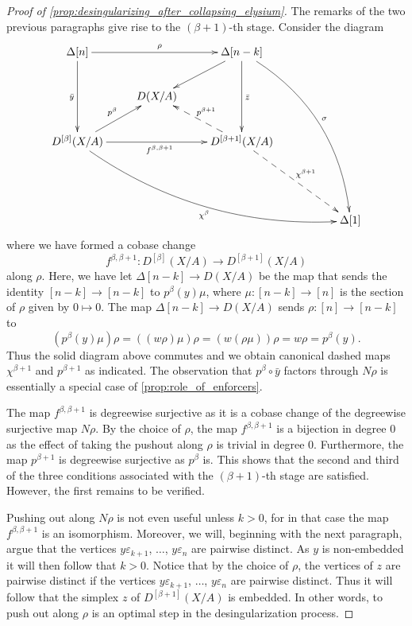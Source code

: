 \begin{proof}[Proof of \cref{prop:desingularizing_after_collapsing_elysium}]
The remarks of the two previous paragraphs give rise to the $(\beta +1)$-th stage. Consider the diagram
\begin{displaymath}
\xymatrix{
\Delta [n] \ar[dd]_{\bar{y} } \ar[rr]^\rho && \Delta [n-k] \ar[ld] \ar[dd]^{\bar{z} } \ar@/^2pc/[ddddrr]^\sigma \\
& D(X/A) \\
D^{[\beta ]}(X/A) \ar[ur]^{p^\beta } \ar@/_2pc/[ddrrrr]_{\chi ^\beta } \ar[rr]_{f^{\beta ,\beta +1}} && D^{[\beta +1]}(X/A) \ar@{-->}[lu]_{p^{\beta +1}} \ar@{-->}[ddrr]^{\chi ^{\beta +1}} \\
\\
&&&& \Delta [1]
}
\end{displaymath}
where we have formed a cobase change
\[f^{\beta ,\beta +1}:D^{[\beta ]}(X/A)\to D^{[\beta +1]}(X/A)\]
along $\rho$. Here, we have let $\Delta [n-k]\to D(X/A)$ be the map that sends the identity $[n-k]\to [n-k]$ to $p^\beta (y)\mu$, where $\mu :[n-k]\to [n]$ is the section of $\rho$ given by $0\mapsto 0$. The map $\Delta [n-k]\to D(X/A)$ sends $\rho :[n]\to [n-k]$ to
\[(p^\beta (y)\mu )\rho =((w\rho )\mu )\rho =(w(\rho \mu ))\rho =w\rho =p^\beta (y).\]
Thus the solid diagram above commutes and we obtain canonical dashed maps $\chi ^{\beta +1}$ and $p^{\beta +1}$ as indicated. The observation that $p^\beta \circ \bar{y}$ factors through $N\rho$ is essentially a special case of \cref{prop:role_of_enforcers}.

The map $f^{\beta ,\beta +1}$ is degreewise surjective as it is a cobase change of the degreewise surjective map $N\rho$. By the choice of $\rho$, the map $f^{\beta ,\beta +1}$ is a bijection in degree $0$ as the effect of taking the pushout along $\rho$ is trivial in degree $0$. Furthermore, the map $p^{\beta +1}$ is degreewise surjective as $p^\beta$ is. This shows that the second and third of the three conditions associated with the $(\beta +1)$-th stage are satisfied. However, the first remains to be verified.

Pushing out along $N\rho$ is not even useful unless $k>0$, for in that case the map $f^{\beta ,\beta +1}$ is an isomorphism. Moreover, we will, beginning with the next paragraph, argue that the vertices $y\varepsilon _{k+1}$, $\dots$, $y\varepsilon _n$ are pairwise distinct. As $y$ is non-embedded it will then follow that $k>0$. Notice that by the choice of $\rho$, the vertices of $z$ are pairwise distinct if the vertices $y\varepsilon _{k+1}$, $\dots$, $y\varepsilon _n$ are pairwise distinct. Thus it will follow that the simplex $z$ of $D^{[\beta +1]}(X/A)$ is embedded. In other words, to push out along $\rho$ is an optimal step in the desingularization process.


\end{proof}
